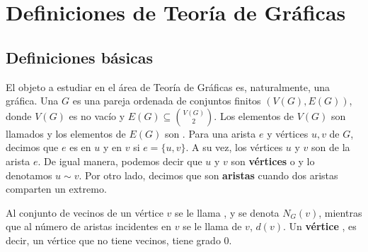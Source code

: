 \chapter{Definiciones de Teor\'ia de Gr\'aficas}%
\label{cap:defs grafs}

\section{Definiciones b\'asicas}%
\label{sec:def-basicas}

El objeto a estudiar en el \'area de Teor\'ia de Gr\'aficas es, naturalmente,
una gr\'afica. Una  $G$ es una pareja ordenada de conjuntos
finitos $(V(G), E(G))$, donde $V(G)$ es no vac\'io y $E(G) \subseteq
\binom{V(G)}{2}$. Los elementos de $V(G)$ son llamados  y los
elementos de $E(G)$ son . Para una arista $e$ y v\'ertices $u,
v$ de $G$, decimos que $e$ es  en $u$ y en $v$ si
$e= \{u, v\}$. A su vez, los v\'ertices $u$ y $v$ son
 de la arista $e$. De igual manera, podemos
decir que $u$ y $v$ son \textbf{v\'ertices}
 o
 y lo denotamos $u \sim v$. Por otro lado,
decimos que son \textbf{aristas}
 cuando dos aristas
comparten un extremo. 

Al conjunto de vecinos de un v\'ertice $v$ se le llama
, y se denota $N_G(v)$, mientras que al n\'umero de aristas
incidentes en $v$ se le llama  de $v$, $d(v)$. Un
\textbf{v\'ertice} , es decir, un v\'ertice que
no tiene vecinos, tiene grado $0$.

